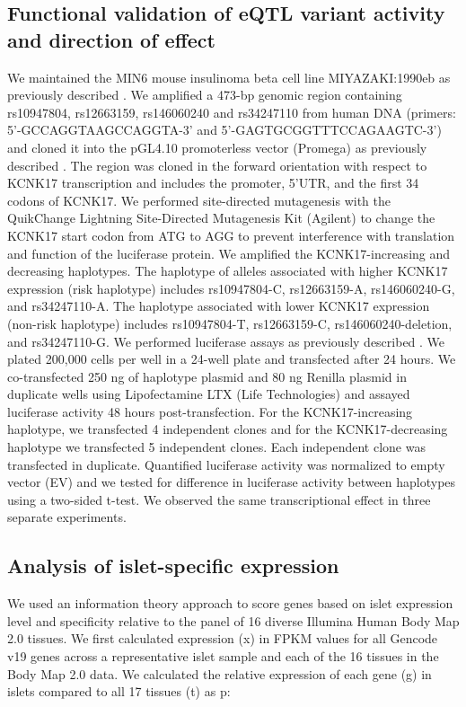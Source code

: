 \subsection{Functional validation of eQTL variant activity and direction of effect}
We maintained the MIN6 mouse insulinoma beta cell line {MIYAZAKI:1990eb} as previously described \cite{kulzerCommonFunctionalRegulatory2014}. We amplified a 473-bp genomic region containing rs10947804, rs12663159, rs146060240 and rs34247110 from human DNA (primers: 5’-GCCAGGTAAGCCAGGTA-3’ and 5’-GAGTGCGGTTTCCAGAAGTC-3’) and cloned it into the pGL4.10 promoterless vector (Promega) as previously described \cite{kulzerCommonFunctionalRegulatory2014}. The region was cloned in the forward orientation with respect to KCNK17 transcription and includes the promoter, 5’UTR, and the first 34 codons of KCNK17. We performed site-directed mutagenesis with the QuikChange Lightning Site-Directed Mutagenesis Kit (Agilent) to change the KCNK17 start codon from ATG to AGG to prevent interference with translation and function of the luciferase protein. We amplified the KCNK17-increasing and decreasing haplotypes. The haplotype of alleles associated with higher KCNK17 expression (risk haplotype) includes rs10947804-C, rs12663159-A, rs146060240-G, and rs34247110-A. The haplotype associated with lower KCNK17 expression (non-risk haplotype) includes rs10947804-T, rs12663159-C, rs146060240-deletion, and rs34247110-G. We performed luciferase assays as previously described \cite{kulzerCommonFunctionalRegulatory2014}. We plated 200,000 cells per well in a 24-well plate and transfected after 24 hours. We co-transfected 250 ng of haplotype plasmid and 80 ng Renilla plasmid in duplicate wells using Lipofectamine LTX (Life Technologies) and assayed luciferase activity 48 hours post-transfection. For the KCNK17-increasing haplotype, we transfected 4 independent clones and for the KCNK17-decreasing haplotype we transfected 5 independent clones. Each independent clone was transfected in duplicate. Quantified luciferase activity was normalized to empty vector (EV) and we tested for difference in luciferase activity between haplotypes using a two-sided t-test. We observed the same transcriptional effect in three separate experiments. 

\subsection{Analysis of islet-specific expression}
We used an information theory approach \cite{schugPromoterFeaturesRelated2005, heGlobalViewEnhancer2014} to score genes based on islet expression level and specificity relative to the panel of 16 diverse Illumina Human Body Map 2.0 tissues. We first calculated expression (x) in FPKM values for all Gencode v19 genes across a representative islet sample and each of the 16 tissues in the Body Map 2.0 data. We calculated the relative expression of each gene (g) in islets compared to all 17 tissues (t) as p:

